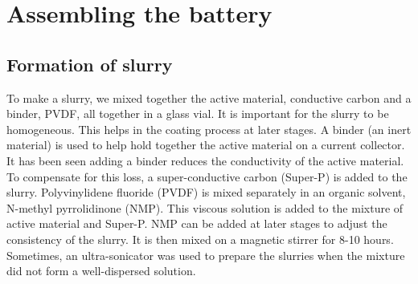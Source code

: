 
\chapter{Assembling the battery} %

\label{Chapter3} %


\newcommand{\keyword}[1]{\textbf{#1}}
\newcommand{\tabhead}[1]{\textbf{#1}}
\newcommand{\code}[1]{\texttt{#1}}
\newcommand{\file}[1]{\texttt{\bfseries#1}}
\newcommand{\option}[1]{\texttt{\itshape#1}}


\section{Formation of slurry}
To make a slurry, we mixed together the active material, conductive carbon and a binder, PVDF, all together in a glass vial. It is important for the slurry to be homogeneous. This helps in the coating process at  later stages. A binder (an inert material) is used to help hold together the active material on a current collector. It has been seen adding a binder reduces the conductivity of the active material. To compensate for this loss, a super-conductive carbon (Super-P) is added to the slurry. Polyvinylidene fluoride (PVDF) is mixed separately in an organic solvent, N-methyl pyrrolidinone (NMP). This viscous solution is added to the mixture of active material and Super-P. NMP can be added at later stages to adjust the consistency of the slurry. It is then mixed on a magnetic stirrer for 8-10 hours. Sometimes, an ultra-sonicator was used to prepare the slurries when the mixture did not form a well-dispersed solution. 

